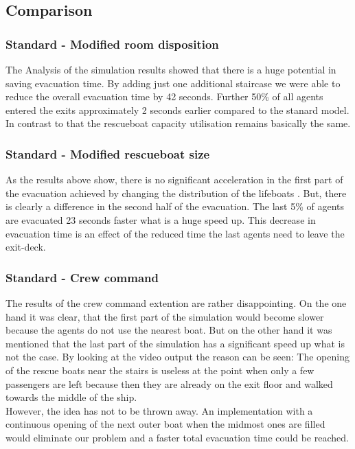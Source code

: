 \documentclass[11pt]{article}
\begin{document}
\subsection{Comparison}
\subsubsection{Standard - Modified room disposition}
The Analysis of the simulation results showed that there is a huge potential in saving evacuation time. By adding just one additional staircase we were able to reduce the overall evacuation time by 42 seconds. Further 50\% of all agents entered the exits approximately 2 seconds earlier compared to the stanard model. In contrast to that the rescueboat capacity utilisation remains basically the same.
\subsubsection{Standard - Modified rescueboat size}

As the results above show, there is no significant acceleration in the first part of the evacuation achieved by changing the distribution of the lifeboats .  
But, there is clearly a difference in the second half of the evacuation. The last 5\% of agents are evacuated 23 seconds faster what is a huge speed up.
This decrease in evacuation time is an effect of the reduced time the last agents need to leave the exit-deck.

\subsubsection{Standard - Crew command}
The results of the crew command extention are rather disappointing. On the one hand it was clear, that the first part of the simulation would become slower because the agents do not use the nearest boat. But on the other hand it was mentioned that the last part of the simulation has a significant speed up what is not the case. By looking at the video output the reason can be seen: The opening of the rescue boats near the stairs is useless at the point when only a few passengers are left because then they are already on the exit floor and walked towards the middle of the ship.\\
However, the idea has not to be thrown away. An implementation with a continuous opening of the next outer boat when the midmost ones are filled would eliminate our problem and a faster total evacuation time could be reached.
\end{document}
